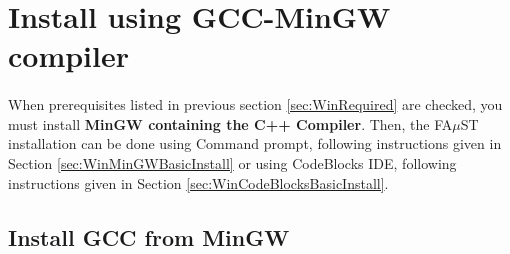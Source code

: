 \section{Install using GCC-MinGW compiler}\label{sec:WinInstallMinGW}

\paragraph{}When prerequisites listed in previous section \ref{sec:WinRequired} are checked, you must install \textbf{MinGW containing the C++ Compiler}. 
Then, the FA$\mu$ST installation can be done using Command prompt, following instructions given in Section \ref{sec:WinMinGWBasicInstall} or using CodeBlocks IDE, following instructions given in Section \ref{sec:WinCodeBlocksBasicInstall}. 


\subsection{Install GCC from MinGW}
\label{sec:WinInstallCompilerMinGW}

